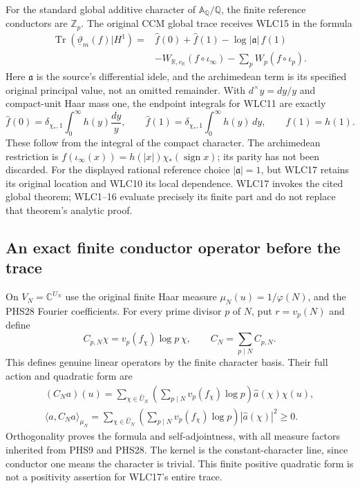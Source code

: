 For the standard global additive character of $\mathbb A_{\mathbb Q}/
\mathbb Q$, the finite reference conductors are $\mathbb Z_p$.
The original CCM global trace receives WLC15 in the formula
\begin{equation}\tag{WLC17}
\begin{split}
 \operatorname{Tr}(\underline\vartheta_m(f)|H^1)
 ={}&\widehat f(0)+\widehat f(1)-\log|\mathfrak a|\,f(1)\\
 &-W_{\mathbb R,e_{\mathbb R}}(f\circ\iota_\infty)
 -\sum_p W_p(f\circ\iota_p).
\end{split}
\end{equation}
Here $\mathfrak a$ is the source's differential idele, and the
archimedean term is its specified original principal value, not
an omitted remainder. With $d^\times y=dy/y$ and compact-unit
Haar mass one, the endpoint integrals for WLC11 are exactly
\begin{equation}\tag{WLC18}
 \widehat f(0)=\delta_{\chi_*,1}\int_0^\infty h(y)\frac{dy}{y},\qquad
 \widehat f(1)=\delta_{\chi_*,1}\int_0^\infty h(y)\,dy,
 \qquad f(1)=h(1).
\end{equation}
These follow from the integral of the compact character. The
archimedean restriction is
$f(\iota_\infty(x))=h(|x|)\chi_*(\operatorname{sign}x)$;
its parity has not been discarded. For the displayed rational
reference choice $|\mathfrak a|=1$, but WLC17 retains its
original location and WLC10 its local dependence. WLC17 invokes
the cited global theorem; WLC1--16 evaluate precisely its finite
part and do not replace that theorem's analytic proof.

\subsection{An exact finite conductor operator before the trace}

On $V_N=\mathbb C^{U_N}$ use the original finite Haar measure
$\mu_N(u)=1/\varphi(N)$, and the PHS28 Fourier coefficients.
For every prime divisor $p$ of $N$, put $r=v_p(N)$ and define
\begin{equation}\tag{WLC19}
 C_{p,N}\chi=v_p(f_\chi)\log p\,\chi,\qquad
 C_N=\sum_{p\mid N}C_{p,N}.
\end{equation}
This defines genuine linear operators by the finite character
basis. Their full action and quadratic form are
\begin{equation}\tag{WLC20}
\begin{gathered}
 (C_Na)(u)=\sum_{\chi\in\widehat U_N}
       \left(\sum_{p\mid N}v_p(f_\chi)\log p\right)
                       \widehat a(\chi)\chi(u),\\
 \langle a,C_Na\rangle_{\mu_N}
  =\sum_{\chi\in\widehat U_N}
       \left(\sum_{p\mid N}v_p(f_\chi)\log p\right)
                     |\widehat a(\chi)|^2\ge0.
\end{gathered}
\end{equation}
Orthogonality proves the formula and self-adjointness, with all
measure factors inherited from PHS9 and PHS28. The kernel is
the constant-character line, since conductor one means the
character is trivial. This finite positive quadratic form is
not a positivity assertion for WLC17's entire trace.

